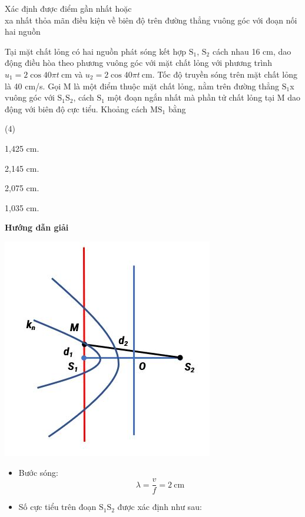 \begin{dang}{Xác định được điểm gần nhất hoặc\\ xa nhất thỏa mãn điều kiện về biên độ trên đường thẳng vuông góc với đoạn nối hai nguồn}
	{
		Tại mặt chất lỏng có hai nguồn phát sóng kết hợp $\text{S}_1$, $\text{S}_2$ cách nhau 16 cm, dao động điều hòa theo phương vuông góc với mặt chất lỏng với phương trình $u_1 = 2\cos 40\pi t\ \text{cm}$ và $u_2 = 2\cos40\pi t\ \text{cm}$. Tốc độ truyền sóng trên mặt chất lỏng là 40 cm/s. Gọi M là một điểm thuộc mặt chất lỏng, nằm trên đường thẳng $\text{S}_1$x vuông góc với $\text{S}_1\text{S}_2$, cách $\text{S}_1$ một đoạn ngắn nhất mà phần tử chất lỏng tại M dao động với biên độ cực tiểu. Khoảng cách M$\text{S}_1$ bằng
		\begin{mcq}(4)
			\item 1,425 cm.     
			\item 2,145 cm.     
			\item 2,075 cm.     
			\item 1,035 cm.
		\end{mcq}
	}
	{
		\begin{center}
			\textbf{Hướng dẫn giải}
			
			\vspace*{1em}
			\includegraphics[scale=0.8]{../figs/VN12-PH-11-A-007-4-V2-2.JPG}
		\end{center}
		\begin{itemize}
			
			\item Bước sóng:
			$$\lambda = \dfrac{v}{f} = 2\ \text{cm}$$
			
			\item Số cực tiểu trên đoạn $\text{S}_1\text{S}_2$ được xác định như sau:
			

\end{itemize}}
\end{dang}
